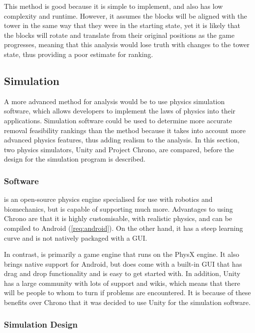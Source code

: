 This method is good because it is simple to implement, and also has low complexity and runtime. However, it assumes the blocks will be aligned with the tower in the same way that they were in the starting state, yet it is likely that the blocks will rotate and translate from their original positions as the game progresses, meaning that this analysis would lose truth with changes to the tower state, thus providing a poor estimate for ranking.



\subsection{Simulation}\label{subsec:simulation}

A more advanced method for analysis would be to use physics simulation software, which allows developers to implement the laws of physics into their applications. Simulation software could be used to determine more accurate removal feasibility rankings than the  method because it takes into account more advanced physics features, thus adding realism to the analysis. In this section, two physics simulators, Unity and Project Chrono, are compared, before the design for the simulation program is described.

\subsubsection{Software}

\cite{projectchrono} is an open-source physics engine specialised for use with robotics and biomechanics, but is capable of supporting much more. Advantages to using Chrono are that it is highly customisable, with realistic physics, and can be compiled to Android (\cref{req:android}). On the other hand, it has a steep learning curve and is not natively packaged with a GUI.

In contrast, \cite{unity} is primarily a game engine that runs on the PhysX engine. It also brings native support for Android, but does come with a built-in GUI that has drag and drop functionality and is easy to get started with. In addition, Unity has a large community with lots of support and wikis, which means that there will be people to whom to turn if problems are encountered. It is because of these benefits over Chrono that it was decided to use Unity for the simulation software.

\subsubsection{Simulation Design}

